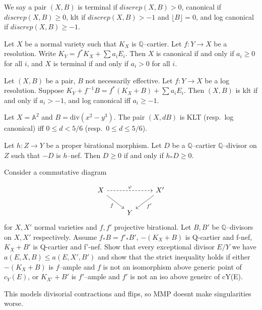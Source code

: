 \begin{definition}
    We say a pair \((X,B)\) is terminal if \(discrep(X,B)>0\), canonical if
    \(discrep(X,B)\geq 0\), klt if \(discrep(X,B)> -1\) and \(\lfloor B
    \rfloor=0\), and log canonical if \(discrep(X,B)\geq -1\).
\end{definition}

\begin{proposition}
    Let \(X\) be a normal variety such that \(K_X\) is \(\mathbb{Q}\)--cartier.
    Let \(f:Y\to X\) be a resolution. Write \(K_Y=f^\ast K_X + \sum a_iE_i\).
    Then \(X\) is canonical if and only if \(a_i\geq 0\) for all \(i\), and
    \(X\) is terminal if and only if \(a_i > 0\) for all \(i\).
\end{proposition}

\begin{proposition}
    Let \((X,B)\) be a pair, \(B\) not necessarily effective. Let \(f:Y\to X\)
    be a log resolution. Suppose \(K_Y+f^{-1}B = f^\ast(K_X+B)+\sum a_i E_i\).
    Then \((X,B)\) is klt if and only if \(a_i >-1\), and  log canonical iff
    \(a_i\geq -1\).
\end{proposition}

\begin{exercise}
 Let \(X=\mathbb{A}^2\) and \(B=\text{div}(x^2-y^3)\). The pair \((X, dB)\) is
 KLT (resp.\ log canonical) iff \(0\leq d < 5/6\) (resp.\ \(0\leq d \leq 5/6\)).
\end{exercise}

\begin{lemma}
    Let \(h:Z\to Y\) be a proper birational morphism. Let \(D\) be a
    \(\mathbb{Q}\)--cartier \(\mathbb{Q}\)--divisor on \(Z\) such that \(-D\) is
    \(h\)--nef. Then \(D\geq 0\) if and only if \(h_\ast D \geq 0\).
\end{lemma}

\begin{exercise}
Consider a commutative diagram

\[\begin{tikzcd}
    X \arrow[rr,dashrightarrow, "\varphi"] \arrow[dr, "f"'] && X' \arrow[dl,
    "f'"] \\
    &Y&
\end{tikzcd}\]
for \(X,X'\) normal varieties and \(f,f'\) projective birational. Let \(B,B'\)
be \(\mathbb{Q}\)--divisors on \(X,X'\) respectively. Assume \(f_\ast B=f'_\ast
B'\), \(-(K_X+B)\) is Q-cartier and f-nef, \(K_X+B'\) is Q-cartier and f'-nef.
Show that every exceptional divisor \(E/Y\) we have \(a(E,X,B)\leq a(E,X',B')\)
and show that the strict inequality holds if either \(-(K_X+B)\) is \(f\)--ample
and \(f\) is not an isomorphism above generic point of \(c_Y(E)\), or
\(K_{X'}+B'\) is \(f'\)--ample and \(f'\) is not an iso above geneirc of cY(E).

This models divisorial contractions and flips, so MMP doesnt make singularities
worse.
\end{exercise}

